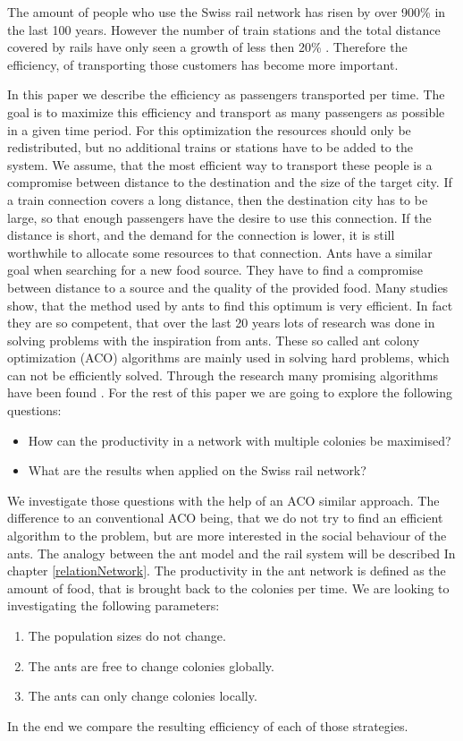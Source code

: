 The amount of people who use the Swiss rail network has risen by over 900\% in the last 100 years. However the number of train stations and the total distance covered by rails have only seen a growth of less then 20\% \citep{SbbStats}. Therefore the efficiency, of transporting those customers has become more important. 

In this paper we describe the efficiency as passengers transported per time. The goal is to maximize this efficiency and transport as many passengers as possible in a given time period. For this optimization the resources should only be redistributed, but no additional trains or stations have to be added to the system. We assume, that the most efficient way to transport these people is a compromise between distance to the destination and the size of the target city. If a train connection covers a long distance, then the destination city has to be large, so that enough passengers have the desire to use this connection. If the distance is short, and the demand for the connection is lower, it is still worthwhile to allocate some resources to that connection.
Ants have a similar goal when searching for a new food source. They have to find a compromise between distance to a source and the quality of the provided food. Many studies show, that the method used by ants to find this optimum is very efficient. In fact they are so competent, that over the last 20 years lots of research was done in solving problems with the inspiration from ants. These so called ant colony optimization (ACO) algorithms are mainly used in solving hard problems, which can not be efficiently solved. Through the research many promising algorithms have been found \citep{Aco1}.
For the rest of this paper we are going to explore the following questions:
\begin{itemize}
  \item How can the productivity in a network with multiple colonies be maximised?
  \item What are the results when applied on the Swiss rail network?
\end{itemize}
We investigate those questions with the help of an ACO similar approach. The difference to an conventional ACO being, that we do not try to find an efficient algorithm to the problem, but are more interested in the social behaviour of the ants. The analogy between the ant model and the rail system will be described In chapter \ref{relationNetwork}. The productivity in the ant network is defined as the amount of food, that is brought back to the colonies per time. We are looking to investigating the following parameters:
\begin{enumerate}
	\item The population sizes do not change.
	\item The ants are free to change colonies globally.
	\item The ants can only change colonies locally.
\end{enumerate}
In the end we compare the resulting efficiency of each of those strategies. 
